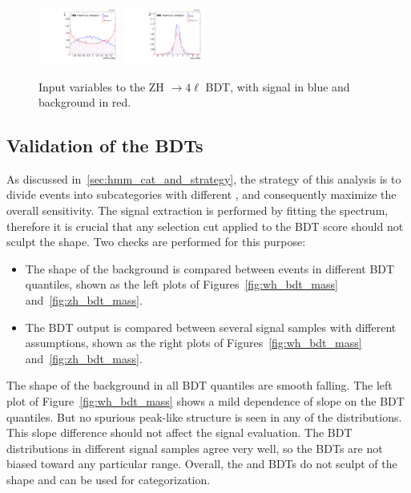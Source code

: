 \begin{figure}[!htb]
    \includegraphics[width=0.24\textwidth]{pics/VH_sec/BDT_train_ZH/BDT_cts_dipair_H.pdf}           
    \includegraphics[width=0.24\textwidth]{pics/VH_sec/BDT_train_ZH/BDT_dipair_dEta_H.pdf}

    \caption{Input variables to the ZH $\to 4\ell$ BDT, with signal in blue and background in red.}
    \label{fig:zh_bdt_vars}
\end{figure}


\clearpage
\subsection{Validation of the BDTs}\label{subsec:bdt_validation}

As discussed in~\ref{sec:hmm_cat_and_strategy}, the strategy of this analysis is to divide events into subcategories with different \SoB,
and consequently maximize the overall sensitivity.
The signal extraction is performed by fitting the \mmm spectrum, therefore it is crucial that 
any selection cut applied to the BDT score should not sculpt the \mmm shape.
Two checks are performed for this purpose:
\begin{itemize}
	\item The \mmm shape of the background is compared between events in different BDT quantiles, shown as the left plots of Figures~\ref{fig:wh_bdt_mass} and~\ref{fig:zh_bdt_mass}. 
	\item The BDT output is compared between several signal samples with different \mh assumptions, shown as the right plots of Figures~\ref{fig:wh_bdt_mass} and~\ref{fig:zh_bdt_mass}.
\end{itemize}
The \mmm shape of the background in all BDT quantiles are smooth falling.
The left plot of Figure~\ref{fig:wh_bdt_mass} shows a mild dependence of slope on the BDT quantiles.
But no spurious peak-like structure is seen in any of the distributions.
This slope difference should not affect the signal evaluation.
The BDT distributions in different signal samples agree very well,
so the BDTs are not biased toward any particular \mmm range. 
Overall, the \WH and \ZH BDTs do not sculpt of the \mmm shape
and can be used for categorization.


